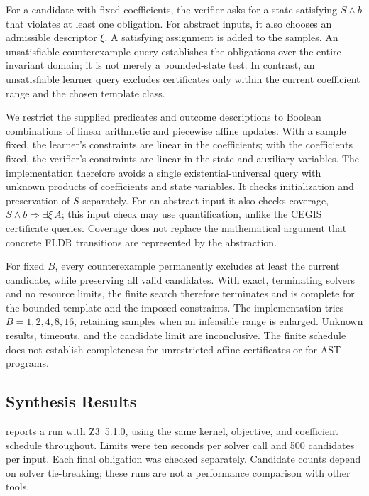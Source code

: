 For a candidate with fixed coefficients, the verifier asks for a state
satisfying $S\land b$ that violates at least one obligation. For abstract
inputs, it also chooses an admissible descriptor $\xi$. A satisfying
assignment is added to the samples. An unsatisfiable counterexample query
establishes the obligations over the entire invariant domain; it is not
merely a bounded-state test. In contrast, an unsatisfiable learner query
excludes certificates only within the current coefficient range and the
chosen template class.

We restrict the supplied predicates and outcome descriptions to Boolean
combinations of linear arithmetic and piecewise affine updates. With a
sample fixed, the learner's constraints are linear in the coefficients;
with the coefficients fixed, the verifier's constraints are linear in the
state and auxiliary variables. The implementation therefore avoids a
single existential-universal query with unknown products of coefficients
and state variables. It checks initialization and preservation of $S$
separately. For an abstract input it also checks coverage,
$S\land b\Rightarrow\exists\xi\,A$; this input check may use
quantification, unlike the CEGIS certificate queries. Coverage does not
replace the mathematical argument that concrete FLDR transitions are
represented by the abstraction.

For fixed $B$, every counterexample permanently excludes at least the
current candidate, while preserving all valid candidates. With exact,
terminating solvers and no resource limits, the finite search therefore
terminates and is complete for the bounded template and the imposed
constraints. The implementation tries $B=1,2,4,8,16$, retaining samples
when an infeasible range is enlarged. Unknown results, timeouts, and the
candidate limit are inconclusive. The finite schedule does not establish
completeness for unrestricted affine certificates or for AST programs.

\subsection{Synthesis Results}
\label{sec:synthesis-examples}

 reports a run with Z3~5.1.0, using the same
kernel, objective, and coefficient schedule throughout. Limits were ten
seconds per solver call and 500 candidates per input. Each final obligation
was checked separately. Candidate counts depend on solver tie-breaking;
these runs are not a performance comparison with other tools.

